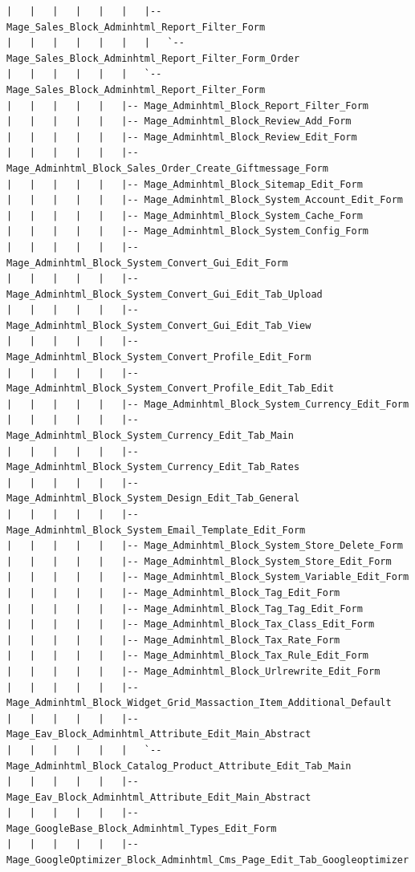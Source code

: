 \documentclass[oneside]{book}
\begin{document}
\begin{lstlisting}
|   |   |   |   |   |   |-- Mage_Sales_Block_Adminhtml_Report_Filter_Form
|   |   |   |   |   |   |   `-- Mage_Sales_Block_Adminhtml_Report_Filter_Form_Order
|   |   |   |   |   |   `-- Mage_Sales_Block_Adminhtml_Report_Filter_Form
|   |   |   |   |   |-- Mage_Adminhtml_Block_Report_Filter_Form
|   |   |   |   |   |-- Mage_Adminhtml_Block_Review_Add_Form
|   |   |   |   |   |-- Mage_Adminhtml_Block_Review_Edit_Form
|   |   |   |   |   |-- Mage_Adminhtml_Block_Sales_Order_Create_Giftmessage_Form
|   |   |   |   |   |-- Mage_Adminhtml_Block_Sitemap_Edit_Form
|   |   |   |   |   |-- Mage_Adminhtml_Block_System_Account_Edit_Form
|   |   |   |   |   |-- Mage_Adminhtml_Block_System_Cache_Form
|   |   |   |   |   |-- Mage_Adminhtml_Block_System_Config_Form
|   |   |   |   |   |-- Mage_Adminhtml_Block_System_Convert_Gui_Edit_Form
|   |   |   |   |   |-- Mage_Adminhtml_Block_System_Convert_Gui_Edit_Tab_Upload
|   |   |   |   |   |-- Mage_Adminhtml_Block_System_Convert_Gui_Edit_Tab_View
|   |   |   |   |   |-- Mage_Adminhtml_Block_System_Convert_Profile_Edit_Form
|   |   |   |   |   |-- Mage_Adminhtml_Block_System_Convert_Profile_Edit_Tab_Edit
|   |   |   |   |   |-- Mage_Adminhtml_Block_System_Currency_Edit_Form
|   |   |   |   |   |-- Mage_Adminhtml_Block_System_Currency_Edit_Tab_Main
|   |   |   |   |   |-- Mage_Adminhtml_Block_System_Currency_Edit_Tab_Rates
|   |   |   |   |   |-- Mage_Adminhtml_Block_System_Design_Edit_Tab_General
|   |   |   |   |   |-- Mage_Adminhtml_Block_System_Email_Template_Edit_Form
|   |   |   |   |   |-- Mage_Adminhtml_Block_System_Store_Delete_Form
|   |   |   |   |   |-- Mage_Adminhtml_Block_System_Store_Edit_Form
|   |   |   |   |   |-- Mage_Adminhtml_Block_System_Variable_Edit_Form
|   |   |   |   |   |-- Mage_Adminhtml_Block_Tag_Edit_Form
|   |   |   |   |   |-- Mage_Adminhtml_Block_Tag_Tag_Edit_Form
|   |   |   |   |   |-- Mage_Adminhtml_Block_Tax_Class_Edit_Form
|   |   |   |   |   |-- Mage_Adminhtml_Block_Tax_Rate_Form
|   |   |   |   |   |-- Mage_Adminhtml_Block_Tax_Rule_Edit_Form
|   |   |   |   |   |-- Mage_Adminhtml_Block_Urlrewrite_Edit_Form
|   |   |   |   |   |-- Mage_Adminhtml_Block_Widget_Grid_Massaction_Item_Additional_Default
|   |   |   |   |   |-- Mage_Eav_Block_Adminhtml_Attribute_Edit_Main_Abstract
|   |   |   |   |   |   `-- Mage_Adminhtml_Block_Catalog_Product_Attribute_Edit_Tab_Main
|   |   |   |   |   |-- Mage_Eav_Block_Adminhtml_Attribute_Edit_Main_Abstract
|   |   |   |   |   |-- Mage_GoogleBase_Block_Adminhtml_Types_Edit_Form
|   |   |   |   |   |-- Mage_GoogleOptimizer_Block_Adminhtml_Cms_Page_Edit_Tab_Googleoptimizer

\end{lstlisting}
\end{document}
